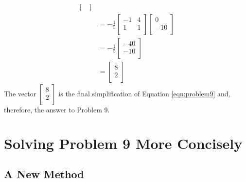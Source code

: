 \documentclass[titlepage]{article}
\begin{document}
\begin{align*}
\begin{bmatrix}
    \end{bmatrix}\\
    &= -\frac{1}{5}
    \begin{bmatrix}
        -1 & 4\\
        1 & 1\\
    \end{bmatrix}
    \begin{bmatrix}
        0\\
        -10\\
    \end{bmatrix}\\
    &= -\frac{1}{5}
    \begin{bmatrix}
        -40\\
        -10\\
    \end{bmatrix}\\
    &=
    \begin{bmatrix}
        8\\
        2\\
    \end{bmatrix}
\end{align*}
The vector $
    \begin{bmatrix}
        8\\
        2\\
    \end{bmatrix}
$ is the final simplification of Equation \ref{eqn:problem9} and, therefore, the answer to Problem 9.
\newpage



\section{Solving Problem 9 More Concisely}\label{sse:concise}
\subsection{A New Method}
\end{document}
